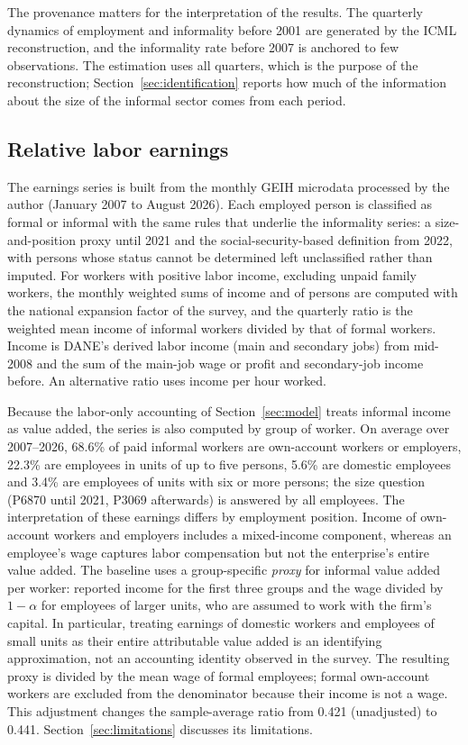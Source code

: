The provenance matters for the interpretation of the results. The quarterly dynamics of employment and informality before 2001 are generated by the ICML reconstruction, and the informality rate before 2007 is anchored to few observations. The estimation uses all quarters, which is the purpose of the reconstruction; Section~\ref{sec:identification} reports how much of the information about the size of the informal sector comes from each period.

\subsection{Relative labor earnings}

The earnings series is built from the monthly GEIH microdata processed by the author (January 2007 to August 2026). Each employed person is classified as formal or informal with the same rules that underlie the informality series: a size-and-position proxy until 2021 and the social-security-based definition from 2022, with persons whose status cannot be determined left unclassified rather than imputed. For workers with positive labor income, excluding unpaid family workers, the monthly weighted sums of income and of persons are computed with the national expansion factor of the survey, and the quarterly ratio is the weighted mean income of informal workers divided by that of formal workers. Income is DANE's derived labor income (main and secondary jobs) from mid-2008 and the sum of the main-job wage or profit and secondary-job income before. An alternative ratio uses income per hour worked.

Because the labor-only accounting of Section~\ref{sec:model} treats informal income as value added, the series is also computed by group of worker. On average over 2007--2026, 68.6\% of paid informal workers are own-account workers or employers, 22.3\% are employees in units of up to five persons, 5.6\% are domestic employees and 3.4\% are employees of units with six or more persons; the size question (P6870 until 2021, P3069 afterwards) is answered by all employees. The interpretation of these earnings differs by employment position. Income of own-account workers and employers includes a mixed-income component, whereas an employee's wage captures labor compensation but not the enterprise's entire value added. The baseline uses a group-specific \emph{proxy} for informal value added per worker: reported income for the first three groups and the wage divided by $1-\alpha$ for employees of larger units, who are assumed to work with the firm's capital. In particular, treating earnings of domestic workers and employees of small units as their entire attributable value added is an identifying approximation, not an accounting identity observed in the survey. The resulting proxy is divided by the mean wage of formal employees; formal own-account workers are excluded from the denominator because their income is not a wage. This adjustment changes the sample-average ratio from 0.421 (unadjusted) to 0.441. Section~\ref{sec:limitations} discusses its limitations.

